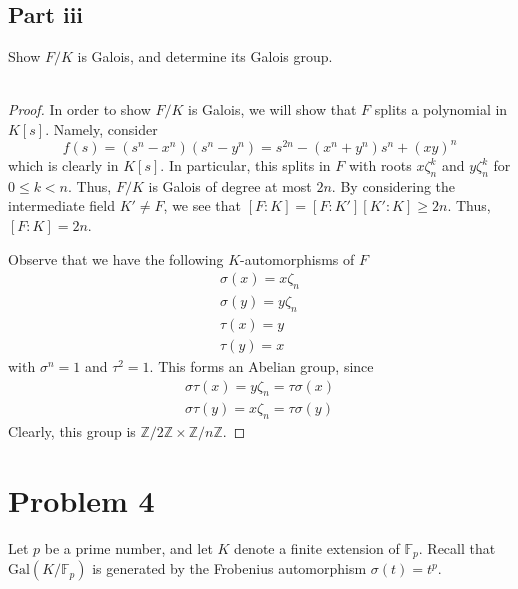 \documentclass[12pt,reqno]{amsart}
\newcommand{\Z}{\mathbb{Z}}
\newcommand{\F}{\mathbb{F}}
\begin{document}
\subsection*{Part iii}
Show $F/K$ is Galois, and determine its Galois group.
\\
\\
\begin{proof}
    In order to show $F/K$ is Galois, we will show that $F$ splits
    a polynomial in $K[s]$. Namely, consider
    \[
        f(s) = (s^n-x^n)(s^n-y^n) = s^{2n}-(x^n+y^n)s^n + (xy)^n
    \]
    which is clearly in $K[s]$. In particular, this splits in $F$ with roots
    $x\zeta_n^k$ and $y\zeta_n^k$ for $0\leq k <n$. Thus, $F/K$ is Galois of
    degree at most $2n$. By considering the intermediate field $K'\neq F$, we
    see that $[F:K] = [F:K'][K':K] \geq 2n$. Thus, $[F:K]=2n$. 

    Observe that we have the following $K$-automorphisms of $F$
    \[
        \begin{aligned}
            \sigma(x) = x\zeta_n\\
            \sigma(y) = y\zeta_n\\
            \tau(x) = y\\
            \tau(y) = x
        \end{aligned}
    \]
    with $\sigma^n=1$ and $\tau^2 = 1$. This forms an Abelian
    group, since
    \[
        \begin{aligned}
    \sigma\tau(x) = y\zeta_n = \tau\sigma(x)\\
    \sigma\tau(y) = x\zeta_n = \tau\sigma(y)
\end{aligned}
    \]
    Clearly, this group is $\Z/{2\Z}\times \Z/{n\Z}$.

\end{proof}

\newpage

\section{Problem 4}
Let $p$ be a prime number, and let $K$ denote a finite extension of $\F_p$.
Recall that $\text{Gal}(K/\F_p)$ is generated by the Frobenius automorphism
$\sigma(t) = t^p$.
\end{document}
